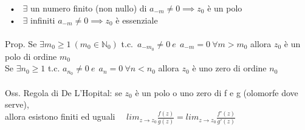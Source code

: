 \documentclass{article}
\theoremstyle{unnumbered}
\theoremstyle{unnumbered1}
\begin{document}
\ • \ $\exists$ un numero finito (non nullo) di $a_{-m}\neq 0 \implies z_0$ è un polo\\
\ • \ $\exists$ infiniti  $a_{-m}\neq 0 \implies z_0$ è essenziale\\ \\
%
Prop. Se $\exists m_0\ge 1 \ (m_0 \in\mathbb{N}_0)$ t.c.\ $a_{-m_0}\neq 0 \ e \ \ a_{-m}=0\ \forall m> m_0$ allora $z_0$ è un polo di ordine $m_0$\\
\phantom{Prop. }Se $\exists n_0\ge 1$ t.c. $a_{n_0}\neq 0 \ e \ \ a_n=0 \ \forall n<n_0$ allora $z_0$ è uno zero di ordine $n_0$\\ \\
%
Oss. Regola di De L'Hopital: se $z_0$ è un polo  o uno zero di f e g (olomorfe dove serve),\\ allora esistono finiti ed uguali \ \ $lim_{z\rightarrow z_0}\frac{f(z)}{g(z)}=lim_{z\rightarrow z_0}\frac{f'(z)}{g'(z)}$ \\
\end{document}
